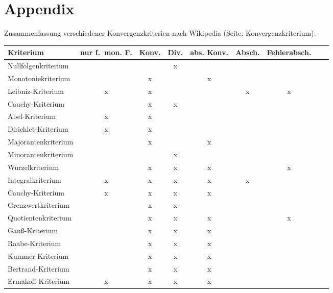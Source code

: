 \documentclass[10pt]{article}
\begin{document}
    \part{Appendix}
    Zusammenfassung verschiedener Konvergenzkriterien nach Wikipedia (Seite: Konvergenzkriterium):
    \begin{center}
        \begin{tabular}{lcccccccp{2cm}}
             \toprule
             Kriterium & {nur f.\ mon. F.} & Konv. & Div. & abs. Konv. & Absch. & Fehlerabsch.\\
             \midrule
             Nullfolgenkriterium &  &  & x &  &  & \\
             Monotoniekriterium &  & x &  & x &  & \\
             Leibniz-Kriterium & x & x &  &  & x & x\\
             Cauchy-Kriterium &  & x & x &  &  & \\
             Abel-Kriterium & x & x &  &  &  & \\
             Dirichlet-Kriterium & x & x &  &  &  & \\
             Majorantenkriterium &  & x &  & x &  & \\
             Minorantenkriterium &  &  & x &  &  & \\
             Wurzelkriterium &  & x & x & x &  & x\\
             Integralkriterium & x & x & x & x & x & \\
             Cauchy-Kriterium & x & x & x & x &  & \\
             Grenzwertkriterium &  & x & x &  &  & \\
             Quotientenkriterium &  & x & x & x &  & x\\
             Gauß-Kriterium &  & x & x & x &  & \\
             Raabe-Kriterium &  & x & x & x &  & \\
             Kummer-Kriterium &  & x & x & x &  & \\
             Bertrand-Kriterium &  & x & x & x &  & \\
             Ermakoff-Kriterium & x & x & x & x &  & \\
             \bottomrule
        \end{tabular}
    \end{center}
\end{document}
